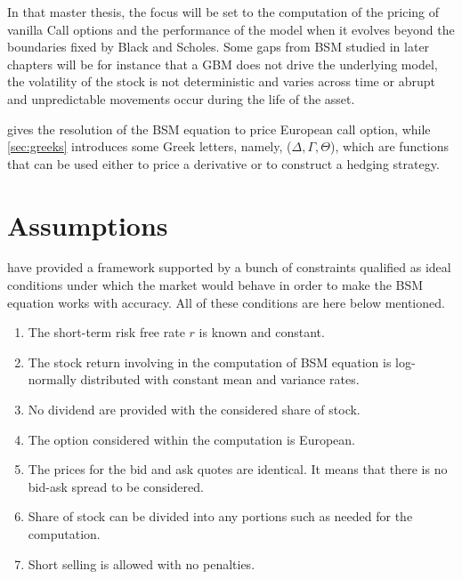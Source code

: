\documentclass[12pt,a4paper]{report}
\begin{document}
In that master thesis, the focus will be set to the computation of the pricing of vanilla Call options and the performance of the model when it evolves beyond the boundaries fixed by Black and Scholes. 
Some gaps from BSM studied in later chapters will be for instance that a GBM does not drive the underlying model, the volatility of the stock is not deterministic and varies across time or abrupt and unpredictable movements occur during the life of the asset.



 gives the resolution of the BSM equation to price European call option, while \cref{sec:greeks} introduces some Greek letters, namely, ($\Delta, \Gamma, \Theta$), which are functions that can be used either to price a derivative or to construct a hedging strategy.



\section{Assumptions}
\label{sec:bsm:assumptions}

\citet{bs} have provided a framework supported by a bunch of constraints qualified as ideal conditions under which the market would behave in order to make the BSM equation works with accuracy. All of these conditions are here below mentioned.

\begin{enumerate}
  \item The short-term risk free rate $r$ is known and constant.
  \item The stock return involving in the computation of BSM equation is log-normally distributed with constant mean and variance rates.
  \item No dividend are provided with the considered share of stock.
  \item The option considered within the computation is European.
  \item The prices for the bid and ask quotes are identical. It means that there is no bid-ask spread to be considered.
  \item Share of stock can be divided into any portions such as needed for the computation.
  \item Short selling is allowed with no penalties.
\end{enumerate}
\end{document}
